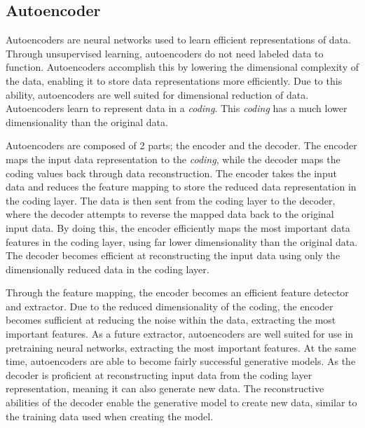 
\subsection{Autoencoder}

Autoencoders are neural networks used to learn efficient representations of data.
Through unsupervised learning, autoencoders do not need labeled data to function.
Autoencoders accomplish this by lowering the dimensional complexity of the data, enabling it to store data representations more efficiently.
Due to this ability, autoencoders are well suited for dimensional reduction of data.
Autoencoders learn to represent data in a \textit{coding}.
This \textit{coding} has a much lower dimensionality than the original data.
\cite[p.~506-508]{Geron2017}

Autoencoders are composed of 2 parts; the encoder and the decoder.
The encoder maps the input data representation to the \textit{coding}, while the decoder maps the coding values back through data reconstruction.
The encoder takes the input data and reduces the feature mapping to store the reduced data representation in the coding layer.
The data is then sent from the coding layer to the decoder, where the decoder attempts to reverse the mapped data back to the original input data.
By doing this, the encoder efficiently maps the most important data features in the coding layer, using far lower dimensionality than the original data.
The decoder becomes efficient at reconstructing the input data using only the dimensionally reduced data in the coding layer.
\cite[p.~506-508]{Geron2017}


Through the feature mapping, the encoder becomes an efficient feature detector and extractor.
Due to the reduced dimensionality of the coding, the encoder becomes sufficient at reducing the noise within the data, extracting the most important features.
As a future extractor, autoencoders are well suited for use in pretraining neural networks, extracting the most important features.
At the same time, autoencoders are able to become fairly successful generative models.
As the decoder is proficient at reconstructing input data from the coding layer representation, meaning it can also generate new data.
The reconstructive abilities of the decoder enable the generative model to create new data, similar to the training data used when creating the model.
\cite[p.~506-508]{Geron2017}
